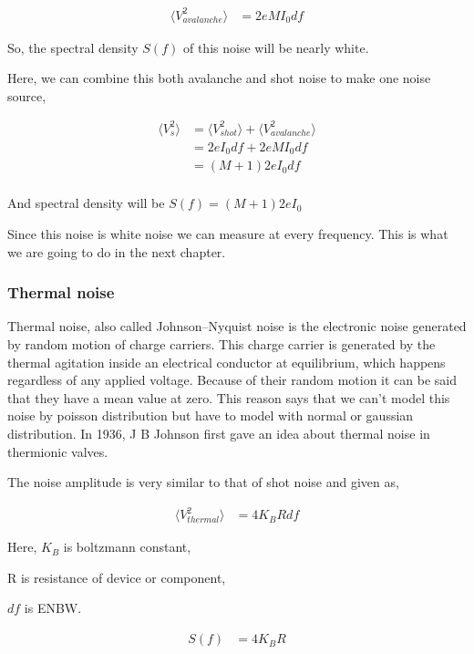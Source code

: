 \begin{align}\label{thavvo}
\langle V_{avalanche}^2\rangle & = 2 e M I_0 df
\end{align}

So, the spectral density $S(f)$ of this noise will be nearly white.
 
Here, we can combine this both avalanche and shot noise to make one noise source,

\begin{align*}
\langle V_{s}^2\rangle & = \langle V_{shot}^2\rangle+\langle V_{avalanche}^2\rangle\\
& = 2 e I_0 df + 2 e M I_0 df\\
& = (M+1) 2 e I_0 df\\
\end{align*}

And spectral density will be $S(f) = (M+1) 2 e I_0$

Since this noise is white noise we can measure at every frequency. This is what we are going to do in the next chapter.



\subsubsection{Thermal noise \label{thth}}

Thermal noise, also called Johnson–Nyquist noise is the electronic noise generated by random motion of charge carriers. This charge carrier is generated by the thermal agitation inside an electrical conductor at equilibrium, which happens regardless of any applied voltage. Because of their random motion it can be said that they have a mean value at zero. This reason says that we can't model this noise by poisson distribution but have to model with normal or gaussian distribution. In 1936, J B Johnson first gave an idea about thermal noise in thermionic valves. \cite{johnson1928thermal}

The noise amplitude is very similar to that of shot noise and given as,

\begin{align}\label{ththvo}
\langle V_{thermal}^2\rangle & = 4 K_B R df
\end{align}

Here, $K_B$ is boltzmann constant,

R is resistance of device or component,

$df$ is ENBW.

\begin{align*}
S(f) & = 4 K_B R
\end{align*}


